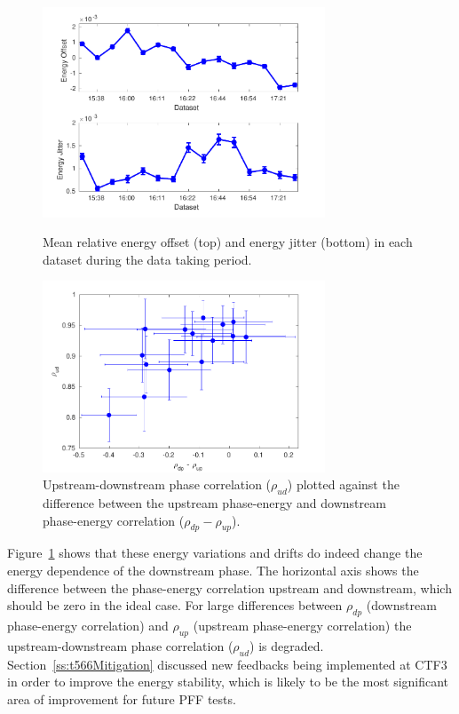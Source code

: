 \begin{figure}
  \centering
  \includegraphics[width=0.75\textwidth]{Figures/feedforward/enOffsetJitter}
  \caption{Mean relative energy offset (top) and energy jitter (bottom) in each dataset during the data taking period.}
  \label{f:longFF_enDrifts}
  \includegraphics[width=0.75\textwidth]{Figures/feedforward/enCorrVsPhasCorr}
  \caption{Upstream-downstream phase correlation (\(\rho_{ud}\)) plotted against the difference between the upstream phase-energy and downstream phase-energy correlation (\(\rho_{dp} - \rho_{up}\)).}
  \label{f:enCorrVsPhasCorr}
\end{figure}

Figure~\ref{f:enCorrVsPhasCorr} shows that these energy variations and drifts do indeed change the energy dependence of the downstream phase. The horizontal axis shows the difference between the phase-energy correlation upstream and downstream, which should be zero in the ideal case. For large differences between \(\rho_{dp}\) (downstream phase-energy correlation) and \(\rho_{up}\) (upstream phase-energy correlation) the upstream-downstream phase correlation (\(\rho_{ud}\)) is degraded. Section~\ref{ss:t566Mitigation} discussed new feedbacks being implemented at CTF3 in order to improve the energy stability, which is likely to be the most significant area of improvement for future PFF tests.

